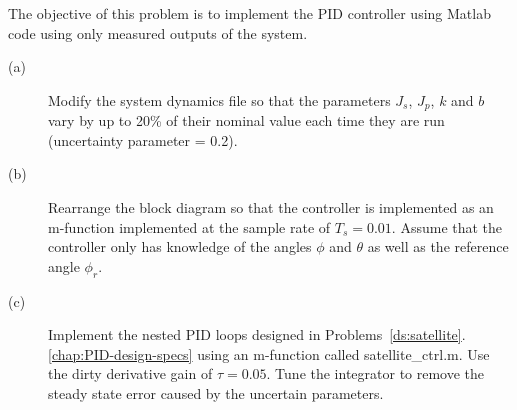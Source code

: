 The objective of this problem is to implement the PID controller using Matlab code using only measured outputs of the system.
\begin{description}
\item[(a)]  Modify the system dynamics file so that the parameters $J_s$, $J_p$, $k$ and $b$ vary by up to 20\% of their nominal value each time they are run (uncertainty parameter = 0.2).
\item[(b)]  Rearrange the block diagram so that the controller is implemented as an m-function implemented at the sample rate of $T_s=0.01$.  Assume that the controller only has knowledge of the angles $\phi$ and $\theta$ as well as the reference angle $\phi_r$.
\item[(c)]  Implement the nested PID loops designed in Problems~\ref{ds:satellite}.\ref{chap:PID-design-specs} using an m-function called satellite\_ctrl.m.   Use the dirty derivative gain of $\tau=0.05$. Tune the integrator to remove the steady state error caused by the uncertain parameters.
\end{description}